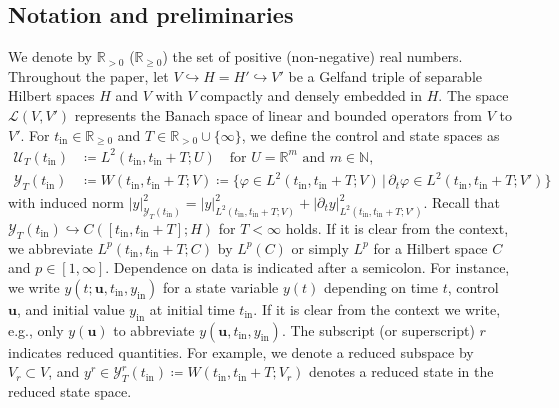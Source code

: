 \documentclass{m2an}
\newcommand{\N}{\mathbb N}
\def\R{\mathbb{R}}
\newcommand{\bu}{\mathbf{u}}
\newcommand{\reduce}[1]{{{#1}^r}}
\newcommand{\tint}{t_{\mathrm{in}}}
\newcommand{\yint}{y_{\mathrm{in}}}
\newcommand{\mU}{{\mathscr U}}
\newcommand{\mY}{{\mathscr Y}}
\newcommand{\norm}[2]{\left|#1\right|_{#2}}
\begin{document}
\subsection{Notation and preliminaries}
%
We denote by $\R_{>0}$ ($\R_{\geq 0}$) the set of positive (non-negative) real numbers.
Throughout the paper, let $V \hookrightarrow  H=H' \hookrightarrow  V'$ be a Gelfand triple of separable Hilbert spaces $H$ and $V$ with $V$ compactly and densely embedded in $H$. The space $\mathcal L(V,V')$ represents the Banach space of linear and bounded operators from $V$ to $V'$. For $\tint \in \R_{\ge0}$ and $T\in \R_{> 0}\cup\{\infty\}$, we define the control and state spaces as
%
\begin{align*}
    \mU_T(\tint)&\coloneqq L^2(\tint,\tint+T;U)\quad\text{for }U=\R^m\text{ and }m\in\N,\\
    \mY_T(\tint)&\coloneqq W(\tint,\tint+T;V)\coloneqq\big\{\varphi\in L^2(\tint,\tint+T;V)\,\big|\,\partial_t\varphi\in L^2(\tint,\tint+T;V')\big\}
\end{align*}
%
with induced norm $\norm{y}{\mY_T(\tint)}^2= \norm{y}{L^2(\tint,\tint+T;V)}^2+\norm{\partial_t y}{{L^2(\tint,\tint+T;V')}}^2$. Recall that $\mY_T(\tint)\hookrightarrow C([\tint,\tint+T];H)$ for $T<\infty$ holds. If it is clear from the context, we abbreviate $L^p(\tint,\tint+T;C)$ by $L^p(C)$ or simply $L^p$ for a Hilbert space $C$ and $p\in [1,\infty]$. Dependence on data is indicated after a semicolon. For instance, we write $y(t;\bu,\tint,\yint)$ for a state variable $y(t)$ depending on time $t$, control $\bu$, and initial value $\yint$ at initial time $\tint$. If it is clear from the context we write, e.g., only $y(\bu)$ to abbreviate $y(\bu,\tint,\yint)$. The subscript (or superscript) $ r$ indicates reduced quantities. For example, we denote a reduced subspace by $V_r\subset V$, and $\reduce{y}\in\mY_T^r(\tint)\coloneqq W(\tint,\tint+T;V_r)$ denotes a reduced state in the reduced state space.
%
\end{document}
